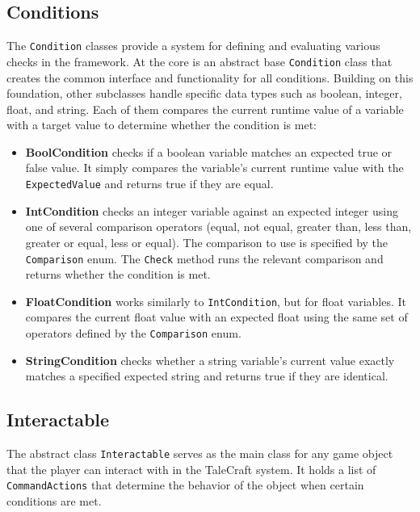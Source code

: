  \subsection{Conditions}
The \verb|Condition| classes provide a system for defining and evaluating various checks in the framework. At the core is an abstract base \verb|Condition| class that creates the common interface and functionality for all conditions. Building on this foundation, other subclasses handle specific data types such as boolean, integer, float, and string. Each of them compares the current runtime value of a variable with a target value to determine whether the condition is met: 

\begin{itemize}
    \item \textbf{BoolCondition} checks if a boolean variable matches an expected true or false value. It simply compares the variable’s current runtime value with the \verb|ExpectedValue| and returns true if they are equal.
    \item \textbf{IntCondition} checks an integer variable against an expected integer using one of several comparison operators (equal, not equal, greater than, less than, greater or equal, less or equal). The comparison to use is specified by the \verb|Comparison| enum. The \verb|Check| method runs the relevant comparison and returns whether the condition is met.
    \item \textbf{FloatCondition} works similarly to \verb|IntCondition|, but for float variables. It compares the current float value with an expected float using the same set of operators defined by the \verb|Comparison| enum.
    \item \textbf{StringCondition} checks whether a string variable’s current value exactly matches a specified expected string and returns true if they are identical.
\end{itemize}

\subsection{Interactable}
The abstract class \verb|Interactable| serves as the main class for any game object that the player can interact with in the TaleCraft system. It holds a list of \verb|CommandActions| that determine the behavior of the object when certain conditions are met. 

